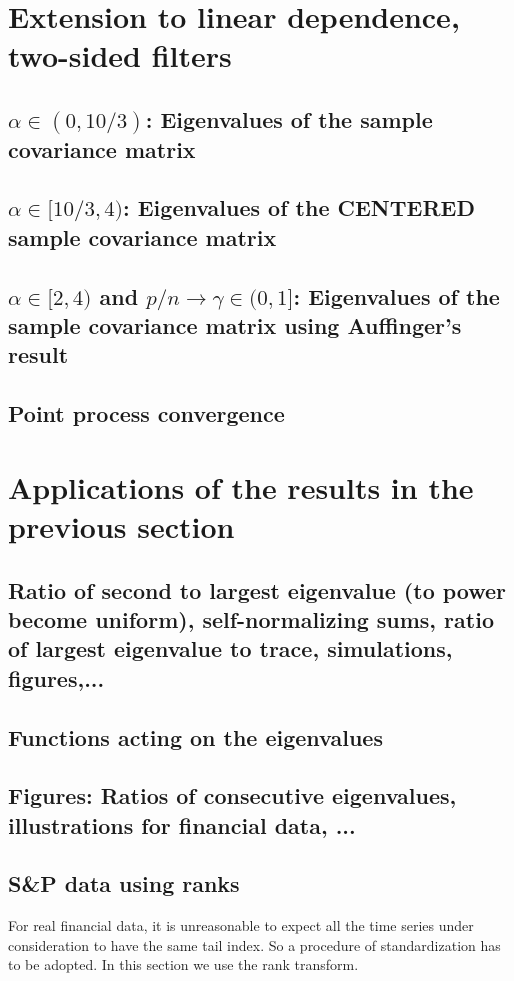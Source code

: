 \documentclass[11pt,reqno]{amsart}
\newcommand{\1}{\mathds{1}}
\newcommand{\0}{\boldsymbol{0}}
\newcommand{\4}{\mathchoice{\mskip1.5mu}{\mskip1.5mu}{}{}}
\newcommand{\5}{\mathchoice{\mskip-1.5mu}{\mskip-1.5mu}{}{}}
\newcommand{\2}{\penalty250\mskip\thickmuskip\mskip-\thinmuskip} %
\begin{document}
\section{Extension to linear dependence, two-sided filters}

\subsection{$\alpha \in (0,10/3)$: Eigenvalues of the sample covariance matrix}
\subsection{$\alpha \in [10/3,4)$: Eigenvalues of the CENTERED sample covariance matrix}
\subsection{$\alpha \in [2,4)$ and $p/n \to \gamma \in (0,1]$:
  Eigenvalues of the sample covariance matrix using Auffinger's
  result}
\subsection{Point process convergence}

\section{Applications of the results in the previous section}

\subsection{Ratio of second to largest eigenvalue (to power become uniform), self-normalizing sums, ratio of largest eigenvalue to trace, simulations, figures,...}
\subsection{Functions acting on the eigenvalues}
\subsection{Figures: Ratios of consecutive eigenvalues, illustrations for financial data, ...}
\subsection{S\&P data using ranks}
For real financial data, it is unreasonable to expect all
the time series under consideration to have the same tail index. So a
procedure of standardization has to be adopted. In this section we
use the rank transform.
\end{document}

